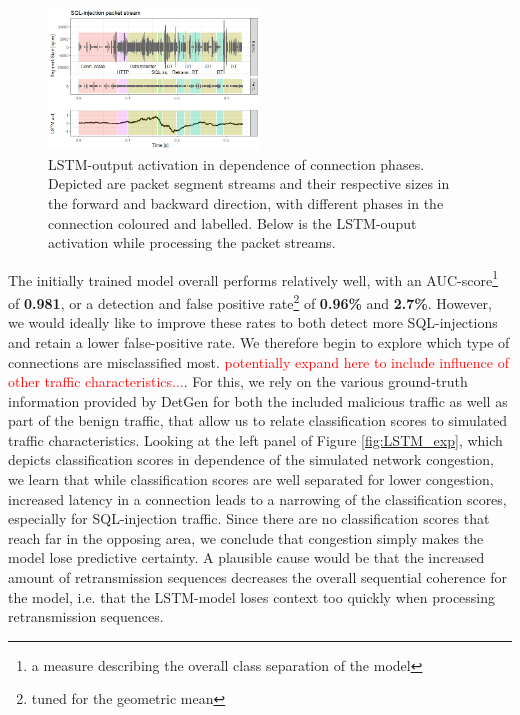 \documentclass[conference]{IEEEtran}
\begin{document}
\begin{figure}
\centering
\includegraphics[width=0.5\textwidth]{images/LSTM_activation.png}
\caption{LSTM-output activation in dependence of connection phases. Depicted are packet segment streams and their respective sizes in the forward and backward direction, with different phases in the connection coloured and labelled. Below is the LSTM-ouput activation while processing the packet streams.}\label{fig:LSTM_act}
\end{figure}

The initially trained model overall performs relatively well, with an AUC-score\footnote{a measure describing the overall class separation of the model} of \textbf{0.981}, or a detection and false positive rate\footnote{tuned for the geometric mean} of \textbf{0.96\%} and \textbf{2.7\%}. However, we would ideally like to improve these rates to both detect more SQL-injections and retain a lower false-positive rate. We therefore begin to explore which type of connections are misclassified most. \textcolor{red}{potentially expand here to include influence of other traffic characteristics...}. For this, we rely on the various ground-truth information provided by DetGen for both the included malicious traffic as well as part of the benign traffic, that allow us to relate classification scores to simulated traffic characteristics. Looking at the left panel of Figure \ref{fig:LSTM_exp}, which depicts classification scores in dependence of the simulated network congestion, we learn that while classification scores are well separated for lower congestion, increased latency in a connection leads to a narrowing of the classification scores, especially for SQL-injection traffic. Since there are no classification scores that reach far in the opposing area, we conclude that congestion simply makes the model lose predictive certainty. A plausible cause would be that the increased amount of retransmission sequences decreases the overall sequential coherence for the model, i.e. that the LSTM-model loses context too quickly when processing retransmission sequences. 
\end{document}
